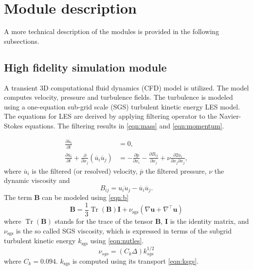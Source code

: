 \documentclass[3p,times,procedia]{elsarticle}
\DeclareMathOperator{\trace}{Tr}
\begin{document}
\section{Module description}

A more technical description of the modules is provided in the following
subsections.

\subsection{High fidelity simulation module}

A transient 3D computational fluid dynamics (CFD) model is utilized. The model
computes velocity, pressure and turbulence fields. The turbulence is modeled
using a one-equation sub-grid scale (SGS) turbulent kinetic energy LES model.
The equations for LES are derived by applying filtering operator to the
Navier-Stokes equations. The filtering results in \eqref{eqn:mass} and
\eqref{eqn:momentum}.

\begin{align}
\frac{\partial \overline{u}_{i}}{\partial t}&=0,
\label{eqn:mass} \\
\frac{\partial \overline{u}_{i}}{\partial t}+\frac{\partial}{\partial x_{j}}(\overline{u}_{i}\overline{u}_{j})&=-\frac{\partial \overline{p}}{\partial x_{i}}-\frac{\partial B_{ij}}{\partial x_{j}}+\nu\frac{\partial{2} \overline{u}_{i}}{\partial x_{j}\partial x_{j}},
\label{eqn:momentum}
\end{align}
where $\overline{u}_{i}$ is the filtered (or resolved) velocity, $\overline{p}$
the filtered pressure, $\nu$ the dynamic viscosity and
\begin{equation}
B_{ij}=\overline{u_{i}u_{j}}-\overline{u}_{i}\overline{u}_{j}.
\end{equation}
The term $\bm B$ can be modeled using \eqref{eqn:b}
\begin{equation}
\bm B = \frac{1}{3}\trace(\bm B) \bm I + \nu_\text{sgs}(\nabla \bm u+\nabla^\intercal \bm u)
\label{eqn:b}
\end{equation}
where $\trace(\bm B)$ stands for the trace of the tensor $\bm B$, $\bm I$ is the
identity matrix, and $\nu_\text{sgs}$ is the so called SGS viscosity, which is
expressed in terms of the subgrid turbulent kinetic energy $k_\text{sgs}$ using
\eqref{eqn:nutles}.
\begin{equation}
\nu_{sgs}=(C_{k}\Delta) k_{sgs}^{1/2}
\label{eqn:nutles}
\end{equation}
where $C_{k}=0.094$. $k_\text{sgs}$ is computed using its transport \eqref{eqn:ksgs}.
\end{document}
